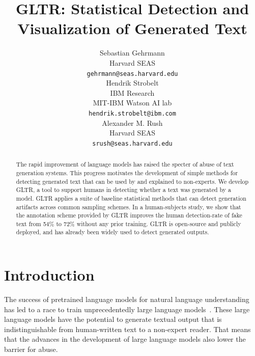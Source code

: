 \documentclass[11pt,a4paper]{article}
\title{GLTR:  Statistical Detection and Visualization of Generated Text}
\author{Sebastian Gehrmann \\
  Harvard SEAS\\
  \small{\texttt{gehrmann@seas.harvard.edu}} \\\And
  Hendrik Strobelt \\
  IBM Research\\
  MIT-IBM Watson AI lab\\
  \small{\texttt{hendrik.strobelt@ibm.com}} \\\And
  Alexander M. Rush \\
  Harvard SEAS \\
  \small{\texttt{srush@seas.harvard.edu}}
  }
\date{}
\begin{document}
\maketitle



\begin{abstract}
The rapid improvement of language models has raised the specter of abuse of text generation systems. This progress motivates the development of simple methods for detecting generated text that can be used by and explained to non-experts. We develop GLTR, a tool to support humans in detecting whether a text was generated by a model. GLTR applies a suite of baseline statistical methods that can detect generation artifacts across common sampling schemes. In a human-subjects study, we show that the annotation scheme provided by GLTR improves the human detection-rate of fake text from 54\% to 72\% without any prior training. GLTR is open-source and publicly deployed, and has already been widely used to detect generated outputs.
\end{abstract}



\section{Introduction}

The success of pretrained language models for natural language understanding~\cite{mccann2017learned,devlin2018bert,peters2018deep} has led to a race to train unprecedentedly large language models~\cite{radford2019language}. These large language models have the potential to generate textual output that is indistinguishable from human-written text to a non-expert reader. That means that the advances in the development of large language models also lower the barrier for abuse.


\end{document}
